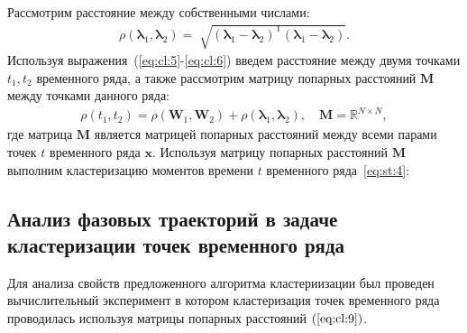 Рассмотрим расстояние между собственными числами:
\[
\label{eq:cl:6}
\begin{aligned}
\rho\left(\bm{\lambda}_1, \bm{\lambda}_2\right) = \sqrt[]{\left(\bm{\lambda}_1 - \bm{\lambda}_2\right)^{\mathsf{T}}\left(\bm{\lambda}_1 - \bm{\lambda}_2\right)}.
\end{aligned}
\]
Используя выражения~(\ref{eq:cl:5}-\ref{eq:cl:6}) введем расстояние между двумя точками $t_1, t_2$ временного ряда, а также рассмотрим матрицу попарных расстояний $\textbf{M}$ между точками данного ряда:
\[
\label{eq:cl:9}
\begin{aligned}
\rho\left(t_1, t_2\right) = \rho\left(\textbf{W}_1, \textbf{W}_2\right) + \rho\left(\bm{\lambda}_1, \bm{\lambda}_2\right), \quad \textbf{M} =  \mathbb{R}^{N\times N},
\end{aligned}
\]
где %
матрица $\textbf{M}$ является матрицей попарных расстояний между всеми парами точек $t$ временного ряда $\textbf{x}$.
Используя матрицу попарных расстояний $\textbf{M}$ выполним кластеризацию моментов времени $t$ временного ряда~\eqref{eq:st:4}:


\subsection{Анализ фазовых траекторий в задаче кластеризации точек временного ряда}
Для анализа свойств предложенного алгоритма кластериизации был проведен вычислительный эксперимент в котором кластеризация точек временного ряда проводилась используя матрицы попарных расстояний $(\ref{eq:cl:9})$.

